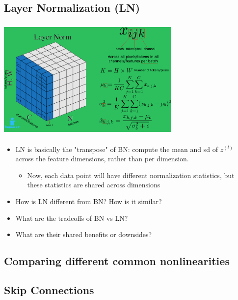 \documentclass{article}
\begin{document}
\subsection{Layer Normalization (LN)}
\begin{center}
    \includegraphics[width=9cm, height=6cm]{Topics/IMAGES/illustrated_layer_norm.png} 
\end{center}
\begin{itemize}
    \item LN is basically the "transpose" of BN: compute the mean and sd of $z^{(l)}$ across the feature dimensions, rather than per dimension.
    \begin{itemize}
        \item Now, each data point will have different normalization statistics, but these statistics are shared across dimensions
    \end{itemize}
    \item How is LN different from BN? How is it similar?
    \item What are the tradeoffs of BN vs LN?
    \item What are their shared benefits or downsides?
\end{itemize}


\subsection{Comparing different common nonlinearities}


\subsection{Skip Connections}


\end{document}
